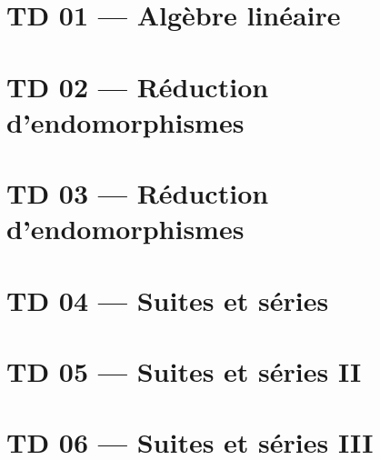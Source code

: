 \documentclass[11pt,a4paper,openany]{report}
\begin{document}
\CollectionTitlePage
{}
\tableofcontents
\clearpage
{}

\chapter{TD 01 — Algèbre linéaire}


\chapter{TD 02 — Réduction d'endomorphismes}


\chapter{TD 03 — Réduction d'endomorphismes}


\chapter{TD 04 — Suites et séries}


\chapter{TD 05 — Suites et séries II}


\chapter{TD 06 — Suites et séries III}

\end{document}
